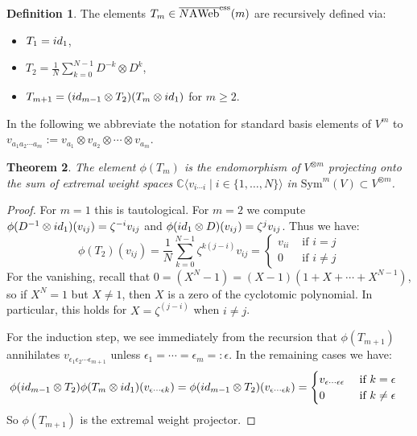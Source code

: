 \documentclass[11pt]{article}
\newtheorem{theo}{Theorem}[section]
\theoremstyle{definition}
\newtheorem{defi}[theo]{Definition}
\numberwithin{equation}{section}
\def\C{{\mathbb C}}
\newcommand{\id}{{\rm id}}
\newcommand{\Sym}{\mathrm{Sym}}\newcommand{\upcev}[1]{\scriptsize\reflectbox{\ensuremath{\vec{\reflectbox{\ensuremath{#1}}}}}}
\newcommand{\cat}[1]{\ensuremath{\mbox{\bfseries {\upshape {#1}}}}}
\newcommand{\diagrep}{\phi}
\newcommand{\wrap}{D}
\newcommand{\AWeb}[1][]{#1\cat{A}\cat{Web}}
\newcommand{\essbAWeb}[1][]{\overline{#1\AWeb}^{\mathrm{ess}}}
\def\la{\langle}
\def\ra{\rangle}
\begin{document}
\begin{defi}\label{def:T} The elements $T_m\in\essbAWeb[N](m)$ are recursively defined via:
\begin{itemize} 
\item $T_1=\id_1$,
\item $T_2=\frac{1}{N}\sum_{k=0}^{N-1} \wrap^{-k}\otimes \wrap^k$,
\item $T_{m+1}=(\id_{m-1}\otimes T_2)(T_m\otimes \id_1)$ for $m\geq 2$.
\end{itemize}
\end{defi}


 In the following we abbreviate the notation for standard basis elements of $V^m$ to $v_{a_1 a_2
\cdots a_m}:=v_{a_1}\otimes v_{a_2} \otimes \cdots \otimes v_{a_m}$.

\begin{theo} \label{thm:extweightproj} The element $\diagrep(T_m)$ is the
  endomorphism of $V^{\otimes m}$ projecting onto the sum of extremal weight spaces
  $\C\la v_{i\cdots i}\mid i\in \{1,\dots,N\}\ra$ in $\Sym^m(V)\subset V^{\otimes
  m}$.
\end{theo}
\begin{proof} For $m=1$ this is tautological. For $m=2$ we compute $\phi( \wrap^{-1}\otimes \id_1)(v_{i j})=\zeta^{-i} v_{i j}$ and $\phi(\id_1 \otimes \wrap)(v_{i j})=\zeta^{j} v_{i j}$. Thus we have:
\[\phi(T_2)(v_{i j}) =  \frac{1}{N}\sum_{k=0}^{N-1} \zeta^{k(j-i)} v_{i j} = \begin{cases} v_{i i} &\text{ if } i=j\\
0 &\text{ if } i \neq j
\end{cases}\]
For the vanishing, recall that $0=(X^N-1)=(X-1)(1+X+\cdots+X^{N-1})$, so if $X^N=1$ but $X\neq 1$, then $X$ is a zero of the cyclotomic polynomial. %
In particular, this holds for $X=\zeta^{(j-i)}$ when $i\neq j$.

For the induction step, we see immediately from the recursion that $\phi(T_{m+1})$ annihilates $v_{\epsilon_1 \epsilon_2\cdots \epsilon_{m+1}}$ unless $\epsilon_1=\cdots=\epsilon_{m}=:\epsilon$. In the remaining cases we have:
\begin{align*}
\phi(\id_{m-1}\otimes T_2)\phi(T_m\otimes \id_1)(v_{\epsilon\cdots \epsilon k}) &= \phi(\id_{m-1}\otimes T_2)(v_{\epsilon\cdots \epsilon k}) =\begin{cases} v_{\epsilon \cdots \epsilon \epsilon} &\text{ if } k=\epsilon\\ 0 &\text{ if } k\neq \epsilon \end{cases}
\end{align*} 
So $\phi(T_{m+1})$ is the extremal weight projector.
\end{proof}
\end{document}
